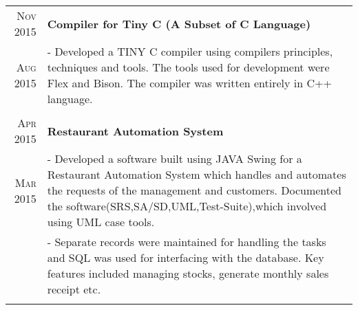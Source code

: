 \documentclass[a4paper,10pt]{extarticle} %
\begin{document}
\begin{tabular}{r|p{16cm}}

\textsc{\normalsize{Nov 2015}} & \textbf{\normalsize{Compiler for Tiny C (A Subset of C Language)}}\\
\textsc {\normalsize{Aug 2015}} & \footnotesize{- Developed a TINY C compiler using compilers principles, techniques and tools. The tools used for development were Flex and Bison. The compiler was written entirely in C++ language.}\\
\multicolumn{2}{c}{} \\

\textsc{\normalsize{Apr 2015}} & \textbf{\normalsize{Restaurant Automation System}}\\
\textsc {\normalsize{Mar 2015}} & \footnotesize{- Developed a software built using JAVA Swing for a Restaurant Automation System which handles and automates the requests of the management and customers. Documented the software(SRS,SA/SD,UML,Test-Suite),which involved using UML case tools.}\\
& \footnotesize{- Separate records were maintained for handling the tasks and SQL was used for interfacing with the database. Key features included managing stocks, generate monthly sales receipt etc.}\\
\multicolumn{2}{c}{} \\
\end{tabular}
\end{document}
